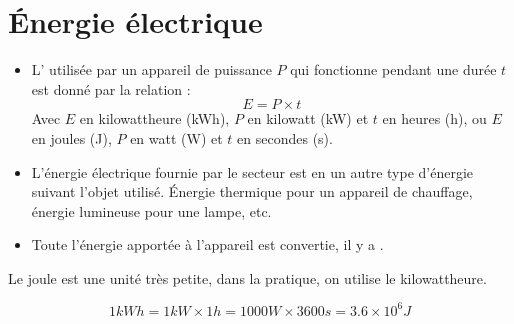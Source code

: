 \documentclass[12pt,a4paper]{article}
\begin{document}
\section{\'Energie électrique}

\begin{mybilan}

	\begin{itemize}
		\item L' utilisée par un appareil de puissance $P$ 	qui fonctionne pendant une durée $t$ est donné par la relation :
			\begin{equation*}
				E = P \times t
			\end{equation*}
			Avec $E$ en kilowattheure (kWh), $P$ en kilowatt (kW) et $t$ en heures (h), ou  $E$ en joules (J), $P$ en watt (W) et $t$ en secondes (s).\\

	
	
		\item L'énergie électrique fournie par le secteur est  en un autre type d'énergie suivant l'objet utilisé. \'Energie thermique pour un appareil de chauffage, énergie lumineuse pour une lampe, etc.
		
		\item Toute l'énergie apportée à l'appareil est convertie, il y a .
	\end{itemize}
	
 
\end{mybilan}

\begin{myrem}
	Le joule est une unité très petite, dans la pratique, on utilise le kilowattheure.

	\begin{equation*}
		1 kWh = 1 kW \times 1h = 1000 W \times 3600 s = \num{3.6} \times 10^{6} J
	\end{equation*}
\end{myrem}


\end{document}

